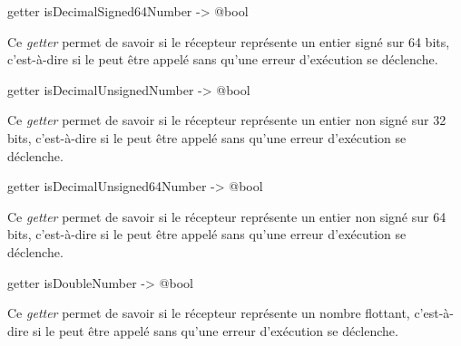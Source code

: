 
\begin{galgasbox}
getter isDecimalSigned64Number -> @bool
\end{galgasbox}

Ce \emph{getter} permet de savoir si le récepteur représente un entier signé sur 64 bits, c'est-à-dire si le  peut être appelé sans qu'une erreur d'exécution se déclenche.







\begin{galgasbox}
getter isDecimalUnsignedNumber -> @bool
\end{galgasbox}

Ce \emph{getter} permet de savoir si le récepteur représente un entier non signé sur 32 bits, c'est-à-dire si le  peut être appelé sans qu'une erreur d'exécution se déclenche.







\begin{galgasbox}
getter isDecimalUnsigned64Number -> @bool
\end{galgasbox}

Ce \emph{getter} permet de savoir si le récepteur représente un entier non signé sur 64 bits, c'est-à-dire si le  peut être appelé sans qu'une erreur d'exécution se déclenche.







\begin{galgasbox}
getter isDoubleNumber -> @bool
\end{galgasbox}

Ce \emph{getter} permet de savoir si le récepteur représente un nombre flottant, c'est-à-dire si le  peut être appelé sans qu'une erreur d'exécution se déclenche.








